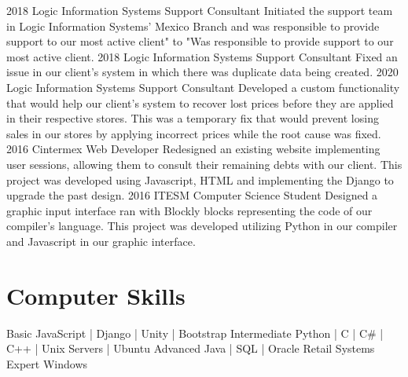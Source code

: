 \documentclass[]{twentysecondcv}
\begin{document}
\begin{twenty}
  \twentyitem
    {2018}
    {Logic Information Systems}
    {Support Consultant}
    {Initiated the support team in Logic Information Systems’ Mexico Branch and was responsible to provide support to our most active client" to "Was responsible to provide support to our most active client.}
  \twentyitem
    {2018}
    {Logic Information Systems}
    {Support Consultant}
    {Fixed an issue in our client’s system in which there was duplicate data being created.}
\twentyitem
    {2020}
    {Logic Information Systems}
    {Support Consultant}
    {Developed a custom functionality that would help our client’s system to recover lost prices before they are applied in their respective stores. This was a temporary fix that would prevent losing sales in our stores by applying incorrect prices while the root cause was fixed.}
\twentyitem
    {2016}
    {Cintermex}
    {Web Developer}
    {Redesigned an existing website implementing user sessions, allowing them to consult their remaining debts with our client. This project was developed using Javascript, HTML and implementing the Django to upgrade the past design.}
\twentyitem
    {2016}
    {ITESM}
    {Computer Science Student}
    {Designed a graphic input interface ran with Blockly blocks representing the code of our compiler's language. This project was developed utilizing Python in our compiler and Javascript in our graphic interface.}
\end{twenty}

\section{Computer Skills}

\begin{twentyshort}
  \twentyitemshort
    {Basic}
    {   JavaScript | Django | Unity | Bootstrap}
  \twentyitemshort
    {Intermediate}
    {   Python | C | C\# | C++ | Unix Servers | Ubuntu}
  \twentyitemshort
    {Advanced}
    {   Java | SQL | Oracle Retail Systems}
  \twentyitemshort
    {Expert}
    {   Windows}
\end{twentyshort}


\end{document}
